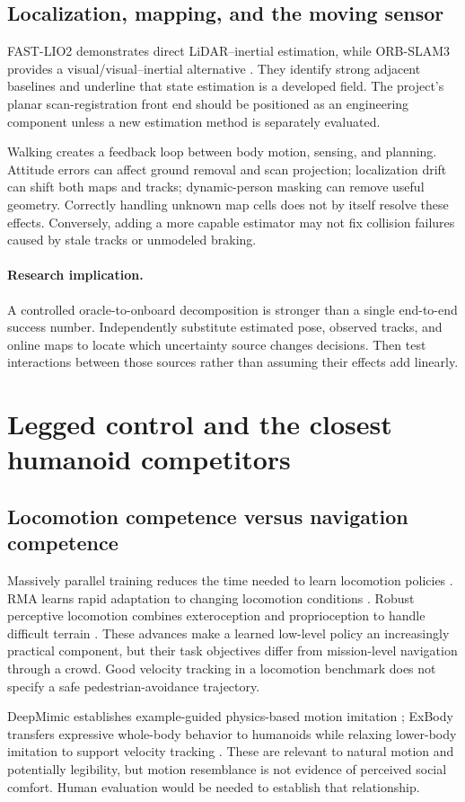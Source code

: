 \documentclass[11pt,a4paper]{article}
\newcommand{\gap}[1]{\paragraph{Research implication.} #1}
\begin{document}
\subsection{Localization, mapping, and the moving sensor}
FAST-LIO2 demonstrates direct LiDAR--inertial estimation, while ORB-SLAM3
provides a visual/visual--inertial alternative \citep{fastlio,orbslam}.
They identify strong adjacent baselines and underline that state estimation
is a developed field. The project's planar scan-registration front end
should be positioned as an engineering component unless a new estimation
method is separately evaluated.

Walking creates a feedback loop between body motion, sensing, and planning.
Attitude errors can affect ground removal and scan projection; localization
drift can shift both maps and tracks; dynamic-person masking can remove useful
geometry. Correctly handling unknown map cells does not by itself resolve
these effects. Conversely, adding a more capable estimator may not fix
collision failures caused by stale tracks or unmodeled braking.

\gap{A controlled oracle-to-onboard decomposition is stronger than a single
end-to-end success number. Independently substitute estimated pose, observed
tracks, and online maps to locate which uncertainty source changes decisions.
Then test interactions between those sources rather than assuming their
effects add linearly.}

\section{Legged control and the closest humanoid competitors}
\label{sec:humanoid}
\subsection{Locomotion competence versus navigation competence}
Massively parallel training reduces the time needed to learn locomotion
policies \citep{rudin}. RMA learns rapid adaptation to changing locomotion
conditions \citep{rma}. Robust perceptive locomotion combines exteroception
and proprioception to handle difficult terrain \citep{rough}.
These advances make a learned low-level policy an increasingly practical
component, but their task objectives differ from mission-level navigation
through a crowd. Good velocity tracking in a locomotion benchmark does not
specify a safe pedestrian-avoidance trajectory.

DeepMimic establishes example-guided physics-based motion imitation
\citep{deepmimic}; ExBody transfers expressive whole-body behavior to
humanoids while relaxing lower-body imitation to support velocity tracking
\citep{expressive}. These are relevant to natural motion and potentially
legibility, but motion resemblance is not evidence of perceived social
comfort. Human evaluation would be needed to establish that relationship.
\end{document}
